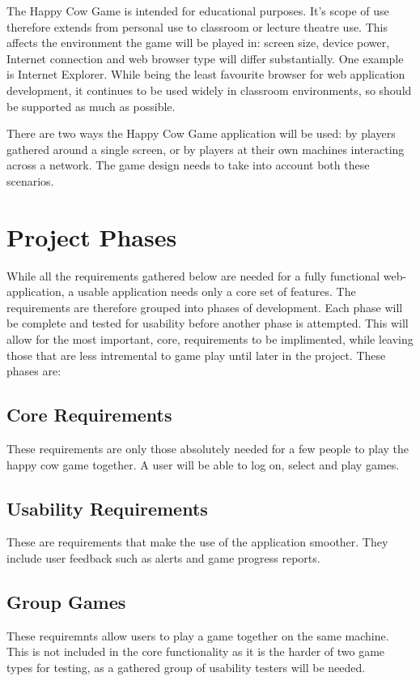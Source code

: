 The Happy Cow Game is intended for educational purposes. It's scope of use therefore extends from personal use to classroom or lecture theatre use. This affects the environment the game will be played in: screen size, device power, Internet connection and web browser type will differ substantially. One example is Internet Explorer. While being the least favourite browser for web application development, it continues to be used widely in classroom environments, so should be supported as much as possible.

There are two ways the Happy Cow Game application will be used: by players gathered around a single screen, or by players at their own machines interacting across a network. The game design needs to take into account both these scenarios.

\section{Project Phases}

While all the requirements gathered below are needed for a fully functional web-application, a usable application needs only a core set of features. The requirements are therefore grouped into phases of development. Each phase will be complete and tested for usability before another phase is attempted. This will allow for the most important, core, requirements to be implimented, while leaving those that are less intremental to game play until later in the project. These phases are:

\subsection{Core Requirements}
\pA These requirements are only those absolutely needed for a few people to play the happy cow game together. A user will be able to log on, select and play games.

\subsection{Usability Requirements}
\pB These are requirements that make the use of the application smoother. They include user feedback such as alerts and game progress reports.

\subsection{Group Games}
\pC These requiremnts allow users to play a game together on the same machine. This is not included in the core functionality as it is the harder of two game types for testing, as a gathered group of usability testers will be needed.

